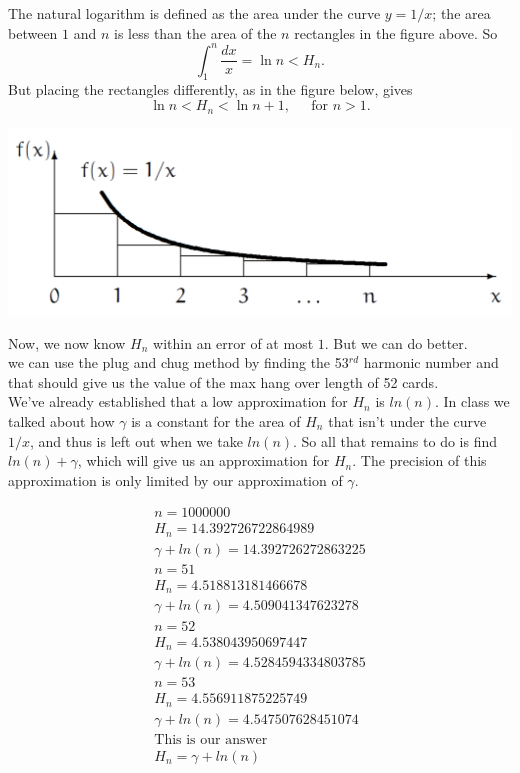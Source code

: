 \documentclass[10pt, AMS Euler]{article}
\begin{document}
	The natural logarithm is defined as the area under the curve $y = 1/x$; the area between $1$ and $n$ is less than the area of the $n$ rectangles in the figure above. 
	So $$\int_1^n \frac{dx}{x} = \ln{n} < H_n.$$
	But placing the rectangles differently, as in the figure below, gives 
	$$\ln{n} < H_n < \ln{n}+1, \;\;\;\; \mbox{ for $n > 1$.}$$
	\begin{center}
		\includegraphics[scale=0.4]{Figures/Harmonic_Right.pdf}
	\end{center}
	Now, we now know $H_n$ within an error of at most $1$. 
	But we can do better.\\

     we can use the plug and chug method by finding the 53$^{rd}$ harmonic number and that should give us the value of the max hang over length of 52 cards. 
     \\

        We've already established that a low approximation for $H_n$ is $ln(n)$. In class we talked about how $\gamma$ is a constant for the area of $H_n$ that isn't under the curve $1/x$, and thus is left out when we take $ln(n)$. So all that remains to do is find $ln(n) + \gamma$, which will give us an approximation for $H_n$. The precision of this approximation is only limited by our approximation of $\gamma$.
     
        \begin{align*}
            n = 1000000 \\ 
            H_n = 14.392726722864989 \\ 
            \gamma + ln(n) = 14.392726272863225\\
            n = 51 \\
            H_n = 4.518813181466678 \\
            \gamma + ln(n) = 4.509041347623278\\
            n = 52 \\
            H_n = 4.538043950697447 \\
            \gamma + ln(n) = 4.5284594334803785\\
            n = 53 \\
            H_n = 4.556911875225749 \\
            \gamma + ln(n) = 4.547507628451074\\
            \text{This is our answer}\\
            H_n = \gamma + ln(n) \\
        \end{align*}
\end{document}
